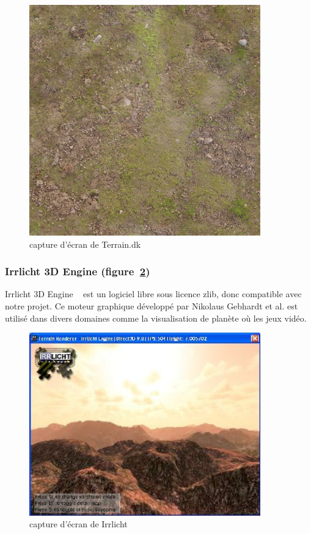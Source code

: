 \begin{figure}[!ht]
    \begin{center}
        \includegraphics[width=10cm]{resources/terraindk.png}
        \caption{capture d'écran de Terrain.dk}
        \label{fig:terrain_dk}
    \end{center}
\end{figure}

\subsubsection{Irrlicht 3D Engine (figure~\ref{fig:irrlicht})}
Irrlicht 3D Engine ~\cite{irrlicht} est un logiciel libre sous licence zlib, donc compatible avec notre projet. Ce moteur graphique développé par Nikolaus Gebhardt et al. est utilisé dans divers domaines comme la visualisation de planète où les jeux vidéo.
\begin{figure}[!ht]
    \begin{center}
        \includegraphics[width=10cm]{resources/irrlicht.jpg}
        \caption{capture d'écran de Irrlicht}
        \label{fig:irrlicht}
    \end{center}
\end{figure}

